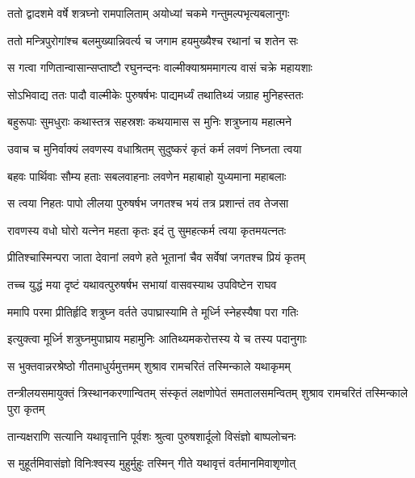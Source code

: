 
\twolineshloka
{ततो द्वादशमे वर्षे शत्रघ्नो रामपालिताम्}
{अयोध्यां चकमे गन्तुमल्पभृत्यबलानुगः} %

\twolineshloka
{ततो मन्त्रिपुरोगांश्च बलमुख्यान्निवर्त्य च}
{जगाम हयमुख्यैश्च रथानां च शतेन सः} %

\twolineshloka
{स गत्वा गणितान्वासान्सप्ताष्टौ रघुनन्दनः}
{वाल्मीक्याश्रममागत्य वासं चक्रे महायशाः} %

\twolineshloka
{सोऽभिवाद्य ततः पादौ वाल्मीकेः पुरुषर्षभः}
{पाद्यमर्ध्यं तथातिथ्यं जग्राह मुनिहस्ततः} %

\twolineshloka
{बहुरूपाः सुमधुराः कथास्तत्र सहस्रशः}
{कथयामास स मुनिः शत्रुघ्नाय महात्मने} %

\twolineshloka
{उवाच च मुनिर्वाक्यं लवणस्य वधाश्रितम्}
{सुदुष्करं कृतं कर्म लवणं निघ्नता त्वया} %

\twolineshloka
{बहवः पार्थिवाः सौम्य हताः सबलवाहनाः}
{लवणेन महाबाहो युध्यमाना महाबलाः} %

\twolineshloka
{स त्वया निहतः पापो लीलया पुरुषर्षभ}
{जगतश्च भयं तत्र प्रशान्तं तव तेजसा} %

\twolineshloka
{रावणस्य वधो घोरो यत्नेन महता कृतः}
{इदं तु सुमहत्कर्म त्वया कृतमयत्नतः} %

\twolineshloka
{प्रीतिश्चास्मिन्परा जाता देवानां लवणे हते}
{भूतानां चैव सर्वेषां जगतश्च प्रियं कृतम्} %

\twolineshloka
{तच्च युद्धं मया दृष्टं यथावत्पुरुषर्षभ}
{सभायां वासवस्याथ उपविष्टेन राघव} %

\twolineshloka
{ममापि परमा प्रीतिर्हृदि शत्रुघ्न वर्तते}
{उपाघ्रास्यामि ते मूर्ध्नि स्नेहस्यैषा परा गतिः} %

\twolineshloka
{इत्युक्त्वा मूर्ध्नि शत्रुघ्नमुपाघ्राय महामुनिः}
{आतिथ्यमकरोत्तस्य ये च तस्य पदानुगाः} %

\twolineshloka
{स भुक्तवान्नरश्रेष्ठो गीतमाधुर्यमुत्तमम्}
{शुश्राव रामचरितं तस्मिन्काले यथाकृमम्} %

\threelineshloka
{तन्त्रीलयसमायुक्तं त्रिस्थानकरणान्वितम्}
{संस्कृतं लक्षणोपेतं समतालसमन्वितम्}
{शुश्राव रामचरितं तस्मिन्काले पुरा कृतम्} %

\twolineshloka
{तान्यक्षराणि सत्यानि यथावृत्तानि पूर्वशः}
{श्रुत्वा पुरुषशार्दूलो विसंज्ञो बाष्पलोचनः} %

\twolineshloka
{स मुहूर्तमिवासंज्ञो विनिःश्वस्य मुहुर्मुहुः}
{तस्मिन् गीते यथावृत्तं वर्तमानमिवाशृणोत्} %

